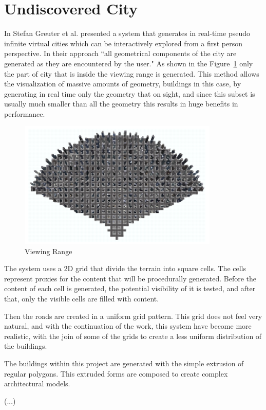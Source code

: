 

\section{Undiscovered City} %
\label{sec:undiscovered_city}

In \cite{Greuter2003} Stefan Greuter et al. presented a system that generates in real-time pseudo infinite virtual cities which can be interactively explored from a first person perspective. In their approach ``all geometrical components of the city are generated as they are encountered by the user." As shown in the Figure~\ref{fig:viewingRange} only the part of city that is inside the viewing range is generated. This method allows the visualization of massive amounts of geometry, buildings in this case, by generating in real time only the geometry that on sight, and since this subset is usually much smaller than all the geometry this results in huge benefits in performance.

\begin{figure}[htbp]
	\centering
	\includegraphics[width=0.85\textwidth]{images/Real-Time-procedural-generation/viewing-range.png}
	\caption{Viewing Range}
	\label{fig:viewingRange}
\end{figure}


The system uses a 2D grid that divide the terrain into square cells. The cells represent proxies for the content that will be procedurally generated. Before the content of each cell is generated, the potential visibility of it is tested, and after that, only the visible cells are filled with content.

Then the roads are created in a uniform grid pattern. This grid does not feel very natural, and with the continuation of the work, this system have become more realistic, with the join of some of the grids to create a less uniform distribution of the buildings.

The buildings within this project are generated with the simple extrusion of regular polygons. This extruded forms are composed to create complex architectural models.


(...)
